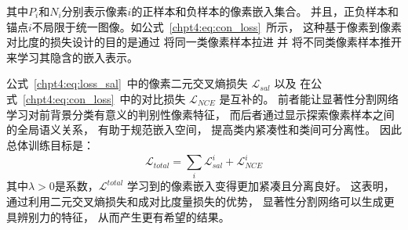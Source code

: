 







其中$P_{i}$和$N_{i}$分别表示像素$i$的正样本和负样本的像素嵌入集合。
并且，正负样本和锚点$i$不局限于统一图像。如公式~\ref{chpt4:eq:con_loss}~所示，
这种基于像素到像素对比度的损失设计的目的是通过
将同一类像素样本拉进
并
将不同类像素样本推开来学习其隐含的嵌入表示。





% 
% 
公式~\ref{chpt4:eq:loss_sal}~中的像素二元交叉熵损失
$\mathcal{L}_{sal} $
以及
在公式~\ref{chpt4:eq:con_loss}~中的对比损失
$\mathcal{L}_{NCE} $
是互补的。
前者能让显著性分割网络学习对前背景分类有意义的判别性像素特征，
而后者通过显示探索像素样本之间的全局语义关系，
有助于规范嵌入空间，
提高类内紧凑性和类间可分离性。
因此总体训练目标是：
\begin{equation}
	\mathcal{L}_{total} = \sum_{i}^{} \mathcal{L}_{sal}^{i} + \mathcal{L}_{NCE}^{i}
\end{equation}
% 
% 
% 
% 
其中$\lambda > 0 $是系数，$\mathcal{L}^{total}$
学习到的像素嵌入变得更加紧凑且分离良好。
这表明，通过利用二元交叉熵损失和成对比度量损失的优势，
显著性分割网络可以生成更具辨别力的特征，
从而产生更有希望的结果。


